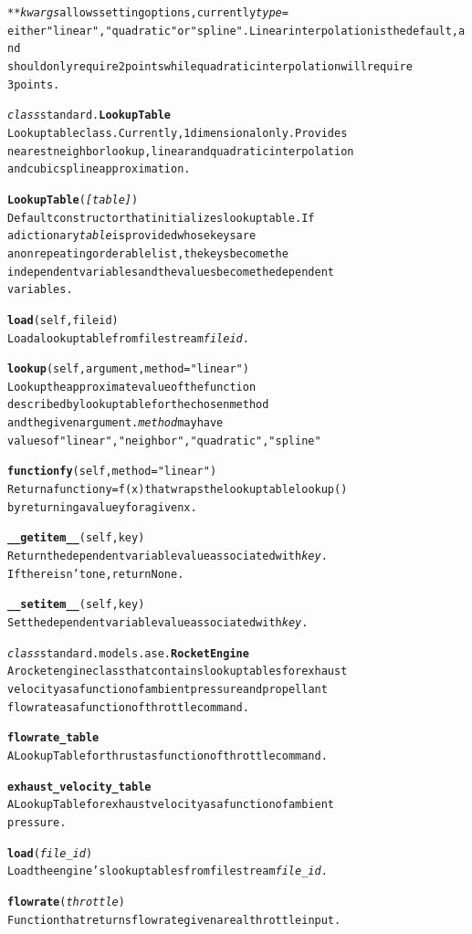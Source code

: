 \documentclass{book}
\begin{document}
\begin{alltt}
    \emph{**kwargs} allows setting options, currently \emph{type=}
    either "linear", "quadratic" or "spline". Linear interpolation is the default, and
    should only require 2 points while quadratic interpolation will require
    3 points.
	
\emph{class} standard.\textbf{LookupTable }
    Lookup table class. Currently, 1 dimensional only. Provides
    nearest neighbor lookup, linear and quadratic interpolation
    and cubic spline approximation. 

  \textbf{LookupTable}(\emph{[table]} )
      Default constructor that initializes lookup table. If 
      a dictionary \emph{table} is provided whose keys are
      a non repeating orderable list, the keys become the
      independent variables and the values become the dependent
      variables.

  \textbf{load}(self,fileid)
      Load a lookup table from file stream \emph{fileid}.

  \textbf{lookup}(self,argument, method="linear")
      Look up the approximate value of the function
      described by lookup table for the chosen method
      and the given argument. \emph{method} may have
      values of "linear", "neighbor","quadratic","spline"

  \textbf{functionfy}(self,method="linear")
      Return a function y = f(x) that wraps the lookup table lookup()
      by returning a value y for a given x.

  \textbf{__getitem__}(self,key)
      Return the dependent variable value associated with \emph{key}.
      If there isn't one, return None.

  \textbf{__setitem__}(self,key)
      Set the dependent variable value associated with \emph{key}.

\emph{class} standard.models.ase.\textbf{RocketEngine}
  A rocket engine class that contains lookup tables for exhaust
  velocity  as a function of ambient pressure and propellant 
  flowrate as a function of throttle command.

  \textbf{flowrate_table} 
    A LookupTable for thrust as function of throttle command.

  \textbf{exhaust_velocity_table}
    A LookupTable for exhaust velocity as a function of ambient
    pressure.

  \textbf{load}(\emph{file_id})
    Load the engine's lookup tables from file stream \emph{file_id}.

  \textbf{flowrate}(\emph{throttle})
    Function that returns flowrate given a real throttle input.


\end{alltt}
\end{document}
